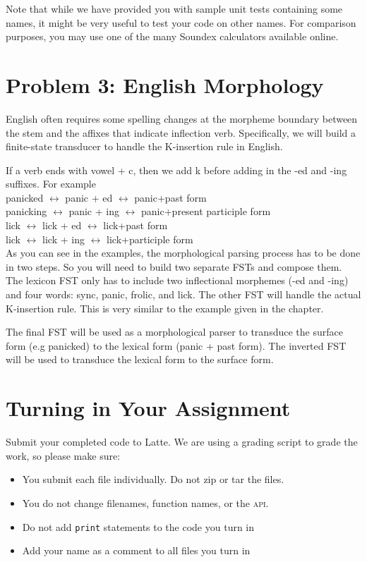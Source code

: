 \documentclass[11pt]{article}
\begin{document}
Note that while we have provided you with sample unit
tests containing some names, it might be very useful to test
your code on other names. For comparison purposes, you may
use one of the many Soundex calculators available online.

\section*{Problem 3: English Morphology}

English often requires some spelling changes at the morpheme boundary between the stem and the affixes that indicate inflection verb.
Specifically, we will build a finite-state transducer to handle the K-insertion rule in English.

If a verb ends with vowel + c, then we add k before adding in the -ed and -ing suffixes. For example \\

\noindent panicked $\leftrightarrow$ panic + ed $\leftrightarrow$ panic+past form\\
panicking $\leftrightarrow$ panic + ing $\leftrightarrow$ panic+present participle form \\
lick $\leftrightarrow$ lick + ed $\leftrightarrow$ lick+past form \\
lick $\leftrightarrow$ lick + ing $\leftrightarrow$ lick+participle form \\

As you can see in the examples, the morphological parsing process has to be done in two steps. So you will need to build two separate FSTs and compose them. 
The lexicon FST only has to include two inflectional morphemes (-ed and -ing) and four words: sync, panic, frolic, and lick. The other FST will handle the actual K-insertion rule. 
This is very similar to the example given in the chapter.

The final FST will be used as a morphological parser to transduce the surface form (e.g panicked) to the lexical form (panic + past form). 
The inverted FST will be used to transduce the lexical form to the surface form. 




\section*{Turning in Your Assignment}

Submit your completed code to Latte. We are using a grading script to grade the work, so please make sure:
\begin{itemize}
  \item You submit each file individually. Do not zip or tar the files. 
  \item You do not change filenames, function names, or the \textsc{api}.
  \item Do not add \texttt{print} statements to the code you turn in
  \item Add your name as a comment to all files you turn in
\end{itemize}
\end{document}
